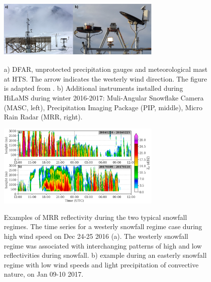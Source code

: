 \documentclass{ametsocV5}
\begin{document}
\begin{figure}[t]
    \noindent\includegraphics[width=19pc,angle=0]{fig3.jpg}\\
    \caption{a) DFAR, unprotected precipitation gauges and meteorological mast at HTS. The arrow indicates the westerly wind direction. The figure is adapted from \protect\citet{wolff_derivation_2015}. b) Additional instruments installed during HiLaMS during winter 2016-2017: Muli-Angular Snowflake Camera (MASC, left), Precipitation Imaging Package (PIP, middle), Micro Rain Radar (MRR, right).
}
    \label{fig:instruments}
\end{figure}

\begin{figure}[t]
    \noindent\includegraphics[width=19pc,angle=0]{fig4.png}\\
    \caption{Examples of MRR reflectivity during the two typical snowfall regimes. The time series for a westerly snowfall regime case during high wind speed on Dec 24-25 2016 (a). The westerly snowfall regime was associated with interchanging patterns of high and low reflectivities during snowfall. b) example during an easterly snowfall regime with low wind speeds and light precipitation of convective nature, on Jan 09-10 2017.
    }
    \label{fig:MRR_refl}
\end{figure}
\end{document}
